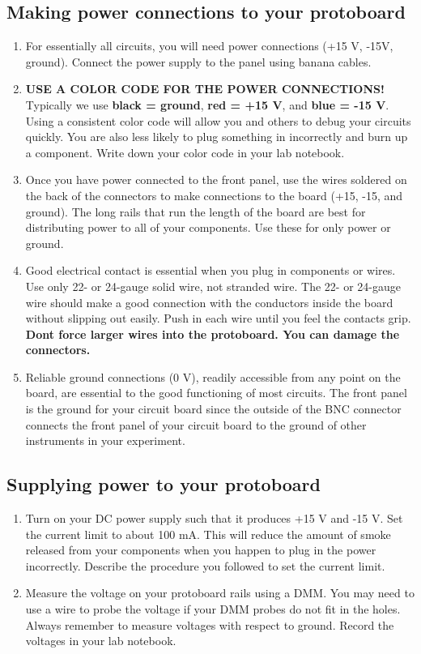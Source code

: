 \documentclass[10pt]{PhysLab1C} %
\begin{document}
\subsection{Making power connections to your protoboard}

\begin{enumerate}
\def\labelenumi{\arabic{enumi}.}
\item
  For essentially all circuits, you will need power connections (+15 V,
  -15V, ground). Connect the power supply to the panel using banana
  cables.
\item
  \textbf{USE A COLOR CODE FOR THE POWER CONNECTIONS!} Typically we use
  \textbf{black = ground}, \textbf{\color{red}red = +15 V}, and \textbf{\color{blue}blue = -15
  V}. Using a consistent color code will allow you and others to debug
  your circuits quickly. You are also less likely to plug something in
  incorrectly and burn up a component. Write down your color code in
  your lab notebook.
\item
  Once you have power connected to the front panel, use the wires
  soldered on the back of the connectors to make connections to the
  board (+15, -15, and ground). The long rails that run the length of
  the board are best for distributing power to all of your components.
  Use these for only power or ground.
\item
  Good electrical contact is essential when you plug in components or
  wires. Use only 22- or 24-gauge solid wire, not stranded wire. The 22-
  or 24-gauge wire should make a good connection with the conductors
  inside the board without slipping out easily. Push in each wire until
  you feel the contacts grip. \textbf{Don\textquotesingle t force larger
  wires into the protoboard. You can damage the connectors.}
\item
  Reliable ground connections (0 V), readily accessible from any point
  on the board, are essential to the good functioning of most circuits.
  The front panel is the ground for your circuit board since the outside
  of the BNC connector connects the front panel of your circuit board to
  the ground of other instruments in your experiment.
\end{enumerate}

\subsection{Supplying power to your protoboard}

\begin{enumerate}
\def\labelenumi{\arabic{enumi}.}
\item
  Turn on your DC power supply such that it produces +15 V and -15 V.
  Set the current limit to about 100 mA. This will reduce the amount of
  smoke released from your components when you happen to plug in the
  power incorrectly. Describe the procedure you followed to set the
  current limit.
\item
  Measure the voltage on your protoboard rails using a DMM. You may need
  to use a wire to probe the voltage if your DMM probes do not fit in
  the holes. Always remember to measure voltages with respect to ground.
  Record the voltages in your lab notebook.
\end{enumerate}
\end{document}
